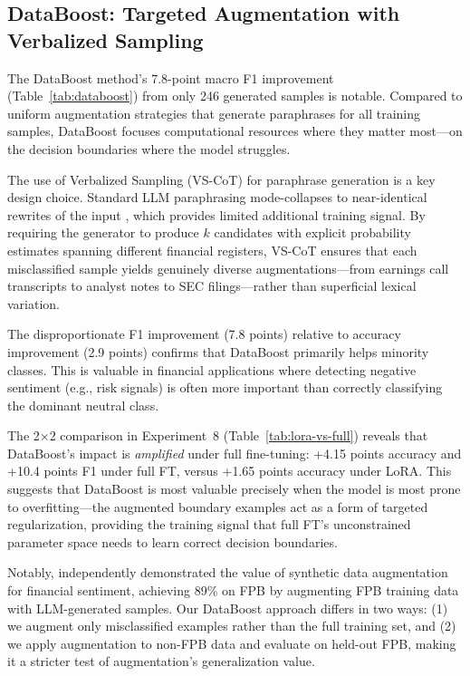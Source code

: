 \documentclass[11pt]{article}
\begin{document}
\subsection{DataBoost: Targeted Augmentation with Verbalized Sampling}

The DataBoost method's 7.8-point macro F1 improvement (Table~\ref{tab:databoost}) from only 246 generated samples is notable. Compared to uniform augmentation strategies that generate paraphrases for all training samples, DataBoost focuses computational resources where they matter most---on the decision boundaries where the model struggles.

The use of Verbalized Sampling (VS-CoT) for paraphrase generation is a key design choice. Standard LLM paraphrasing mode-collapses to near-identical rewrites of the input \citep{zhang2025verbalized}, which provides limited additional training signal. By requiring the generator to produce $k$ candidates with explicit probability estimates spanning different financial registers, VS-CoT ensures that each misclassified sample yields genuinely diverse augmentations---from earnings call transcripts to analyst notes to SEC filings---rather than superficial lexical variation.

The disproportionate F1 improvement (7.8 points) relative to accuracy improvement (2.9 points) confirms that DataBoost primarily helps minority classes. This is valuable in financial applications where detecting negative sentiment (e.g., risk signals) is often more important than correctly classifying the dominant neutral class.

The 2$\times$2 comparison in Experiment~8 (Table~\ref{tab:lora-vs-full}) reveals that DataBoost's impact is \emph{amplified} under full fine-tuning: +4.15 points accuracy and +10.4 points F1 under full FT, versus +1.65 points accuracy under LoRA. This suggests that DataBoost is most valuable precisely when the model is most prone to overfitting---the augmented boundary examples act as a form of targeted regularization, providing the training signal that full FT's unconstrained parameter space needs to learn correct decision boundaries.

Notably, \citet{fatemi2024finbert} independently demonstrated the value of synthetic data augmentation for financial sentiment, achieving 89\% on FPB by augmenting FPB training data with LLM-generated samples. Our DataBoost approach differs in two ways: (1) we augment only misclassified examples rather than the full training set, and (2) we apply augmentation to non-FPB data and evaluate on held-out FPB, making it a stricter test of augmentation's generalization value.
\end{document}
